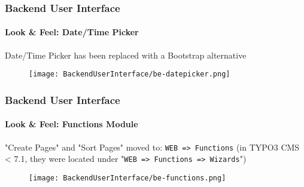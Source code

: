 %

\begin{frame}[fragile]
	\frametitle{Backend User Interface}
	\framesubtitle{Look \& Feel: Date/Time Picker}

	Date/Time Picker has been replaced with a Bootstrap alternative
	\begin{figure}
		\texttt{[image: BackendUserInterface/be-datepicker.png]}
	\end{figure}

\end{frame}


\begin{frame}[fragile]
	\frametitle{Backend User Interface}
	\framesubtitle{Look \& Feel: Functions Module}

	"Create Pages" and "Sort Pages" moved to: \texttt{WEB => Functions}\newline
	\smaller (in TYPO3 CMS < 7.1, they were located under "\texttt{WEB => Functions => Wizards}")

	\begin{figure}
		\texttt{[image: BackendUserInterface/be-functions.png]}
	\end{figure}


\end{frame}

